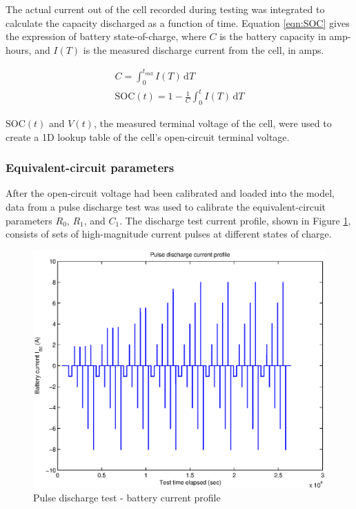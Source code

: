\documentclass[../SimBALink.tex]{subfiles}
\begin{document}
			The actual current out of the cell recorded during testing was integrated to calculate the capacity discharged as a function of time. Equation \ref{eqn:SOC} gives the expression of battery state-of-charge, where $C$ is the battery capacity in amp-hours, and $I(T)$ is the measured discharge current from the cell, in amps.
		
			\begin{gather}
				C = \int_0^{t_\text{end}} \! I(T) \, \mathrm{d}T				\\
				\text{SOC}(t) = 1 - \frac{1}{C} \int_0^{t} \! I(T) \, \mathrm{d}T
				\label{eqn:SOC}
			\end{gather} 
		
			$\text{SOC}(t)$ and $V(t)$, the measured terminal voltage of the cell, were used to create a 1D lookup table of the cell's open-circuit terminal voltage.
			
			\FloatBarrier
			
		\subsubsection{Equivalent-circuit parameters}
			After the open-circuit voltage had been calibrated and loaded into the model, data from a pulse discharge test was used to calibrate the equivalent-circuit parameters $R_0$, $R_1$, and $C_1$. The discharge test current profile, shown in Figure \ref{fig:Pulse_Discharge_Current_Profile}, consists of sets of high-magnitude current pulses at different states of charge.
			
			\begin{figure}[h!]
				\centering
				\includegraphics[width=5in]{../Model/Powertrain/Battery_pack/Documentation/Figures/Validation/Pulse_Discharge_Current_Profile}
				\caption{Pulse discharge test - battery current profile}
				\label{fig:Pulse_Discharge_Current_Profile}
			\end{figure}
			
\end{document}
